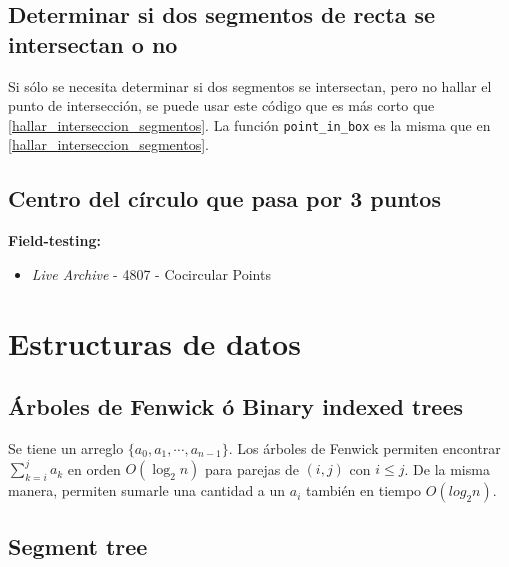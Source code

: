 \documentclass[10pt,letterpaper,twocolumn]{article}
\newcommand{\codigofuente}[1]{

\dotfill
}
\begin{document}
\codigofuente{./src/geometria/segment_segment_intersection.cpp}

\subsection{Determinar si dos segmentos de recta se intersectan o no}

Si sólo se necesita determinar si dos segmentos se intersectan, pero no hallar
el punto de intersección, se puede usar este código que es más corto que \ref{hallar_interseccion_segmentos}.
La función \verb!point_in_box! es la misma que en \ref{hallar_interseccion_segmentos}.

\codigofuente{./src/geometria/check_segment_intersection.cpp}

\subsection{Centro del círculo que pasa por 3 puntos}
\small
\textbf{Field-testing:}
\begin{itemize}
\item \emph{Live Archive} - 4807 - Cocircular Points
\end{itemize}
\normalsize

\codigofuente{./src/geometria/circle_through_3_points.cpp}

\section{Estructuras de datos}
\subsection{Árboles de Fenwick ó Binary indexed trees}

Se tiene un arreglo $\{a_0, a_1, \cdots, a_{n-1}\}$. Los árboles
de Fenwick permiten encontrar $ \displaystyle \sum_{k=i}^{j} a_k $ en orden $O(\log_{2}{n})$ para parejas de $(i, j)$ con $i \leq j$. De la misma manera, permiten sumarle una cantidad a un $a_i$ también en tiempo $O(log_{2}{n})$.
\medskip
\codigofuente{./src/estructuras/fenwick.cpp}

\subsection{Segment tree}
\codigofuente{./src/estructuras/segment_tree.cpp}

\end{document}
